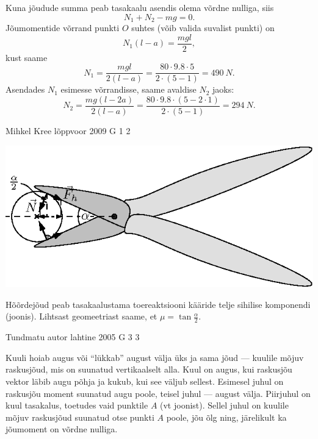 \documentclass[11pt]{article}
\begin{document}
{{Kuna jõudude summa peab tasakaalu asendis olema võrdne nulliga, siis
\[
N_1 + N_2 - mg = 0.
\]
Jõumomentide võrrand punkti $O$ suhtes (võib valida suvalist punkti) on
\[
N_{1}(l-a)=\frac{m g l}{2},
\]
kust saame
\[
N_{1}=\frac{m g l}{2(l-a)}=\frac{80 \cdot \num{9,8} \cdot 5}{2 \cdot(5-1)}=\SI{490}{N}.
\]
Asendades $N_1$ esimesse võrrandisse, saame avaldise $N_2$ jaoks:
\[
N_{2}=\frac{m g(l-2 a)}{2(l-a)}=\frac{80 \cdot \num{9,8} \cdot(5-2 \cdot 1)}{2 \cdot(5-1)}=\SI{294}{N}.
\]
\fi
}

{Mihkel Kree} %
{lõppvoor} %
{2009} %
{G 1} %
{2} %
{

\ifSolution
\begin{center}
	\includegraphics[width=0.9\linewidth]{2009-v3g-01-G_nyrinenud_kaarid_lah.eps}
\end{center}

Hõõrdejõud peab tasakaalustama toereaktsiooni kääride telje sihilise komponendi (joonis). Lihtsast geomeetriast saame, et $\mu = \tan \frac{\alpha}{2}$.
\fi
}

{Tundmatu autor} %
{lahtine} %
{2005} %
{G 3} %
{3} %
{

\ifSolution
Kuuli hoiab augus või \enquote{lükkab} august välja üks ja sama jõud --- kuulile mõjuv raskusjõud, mis on suunatud vertikaalselt alla. Kuul on augus, kui raskusjõu vektor läbib augu põhja ja kukub, kui see väljub sellest. Esimesel juhul on raskusjõu moment suunatud augu poole, teisel juhul --- august välja. Piirjuhul on kuul tasakalus, toetudes vaid punktile $A$ (vt joonist). Sellel juhul on kuulile mõjuv raskusjõud suunatud otse punkti $A$ poole, jõu õlg ning, järelikult ka jõumoment on võrdne nulliga.

}}
\end{document}

